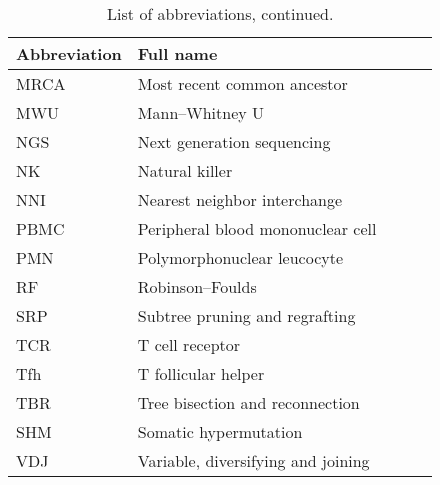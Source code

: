 \vfill

\begin{table}[!ht]
\begin{tabular}{l*{3}{l}r}
	 \textbf{Abbreviation} & \textbf{Full name} \\
	\hline
	MRCA & Most recent common ancestor \\
	MWU & Mann–Whitney U \\
	NGS & Next generation sequencing \\
	NK & Natural killer \\
	NNI & Nearest neighbor interchange \\
	PBMC & Peripheral blood mononuclear cell \\
	PMN & Polymorphonuclear leucocyte \\
	RF & Robinson–Foulds \\
	SRP & Subtree pruning and regrafting \\
	TCR & T cell receptor \\
	Tfh & T follicular helper \\
	TBR & Tree bisection and reconnection \\
	SHM & Somatic hypermutation \\
	VDJ & Variable, diversifying and joining \\
	\hline
\end{tabular}
\caption{List of abbreviations, continued.}
\end{table}

\vfill


\clearpage
\newpage